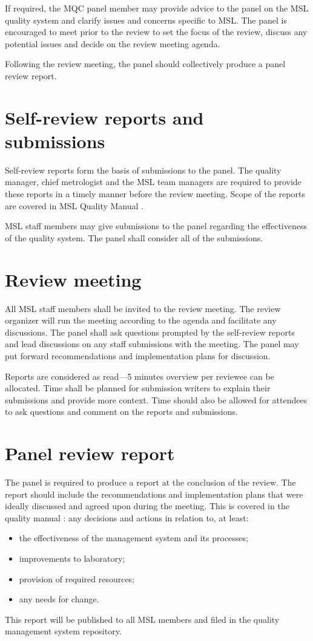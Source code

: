 If required, the MQC panel member may provide advice to the panel on the MSL quality
system and clarify issues and concerns specific to MSL. The panel is encouraged to meet
prior to the review to set the focus of the review, discuss any potential issues and decide on
the review meeting agenda.

Following the review meeting, the panel should collectively produce a panel review report.

\section{Self-review reports and submissions}
Self-review reports form the basis of submissions to the panel. The quality manager, chief
metrologist and the MSL team managers are required to provide these reports in a timely
manner before the review meeting. Scope of the reports are covered in MSL Quality Manual
\cite[\S\ref*{QM-ss:management_review}]{MSL_Quality_Manual}.

MSL staff members may give submissions to the panel regarding the effectiveness of the
quality system. The panel shall consider all of the submissions.

\section{Review meeting}
All MSL staff members shall be invited to the review meeting. The review organizer will run
the meeting according to the agenda and facilitate any discussions. The panel shall ask
questions prompted by the self-review reports and lead discussions on any staff submissions with the meeting. The panel may put forward recommendations and implementation
plans for discussion.

Reports are considered as read---5 minutes overview per reviewee can be allocated. Time
shall be planned for submission writers to explain their submissions and provide more context. Time should also be allowed for attendees to ask questions and comment on the
reports and submissions.

\section{Panel review report}
The panel is required to produce a report at the conclusion of the review. The report should
include the recommendations and implementation plans that were ideally discussed and
agreed upon during the meeting. This is covered in the quality manual \cite[\S\ref*{QM-ss:management_review}]{MSL_Quality_Manual}: any decisions and actions in relation to, at least: 
\begin{itemize}
\item  the effectiveness of the management system and its processes; 
\item improvements to laboratory; 
\item provision of required resources; 
\item any needs for change.
\end{itemize} 
This report will be published to all MSL members and filed in the quality management system
repository.